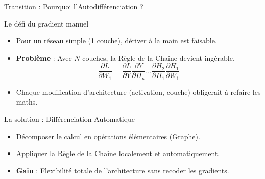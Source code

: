 \documentclass[aspectratio=169,xcolor=dvipsnames]{beamer}
\begin{document}
\begin{frame}{Transition : Pourquoi l'Autodifférenciation ?}
\begin{block}{Le défi du gradient manuel}
\begin{itemize}
    \item Pour un réseau simple (1 couche), dériver à la main est faisable.
    \item \textbf{Problème} : Avec $N$ couches, la Règle de la Chaîne devient ingérable.
    \[ \frac{\partial L}{\partial W_1} = \frac{\partial L}{\partial Y} \frac{\partial Y}{\partial H_n} \dots \frac{\partial H_2}{\partial H_1} \frac{\partial H_1}{\partial W_1} \]
    \item Chaque modification d'architecture (activation, couche) obligerait à refaire les maths.
\end{itemize}
\end{block}

\vspace{0.5cm}

\begin{alertblock}{La solution : Différenciation Automatique}
\begin{itemize}
    \item Décomposer le calcul en opérations élémentaires (Graphe).
    \item Appliquer la Règle de la Chaîne localement et automatiquement.
    \item \textbf{Gain} : Flexibilité totale de l'architecture sans recoder les gradients.
\end{itemize}
\end{alertblock}
\end{frame}
\end{document}
